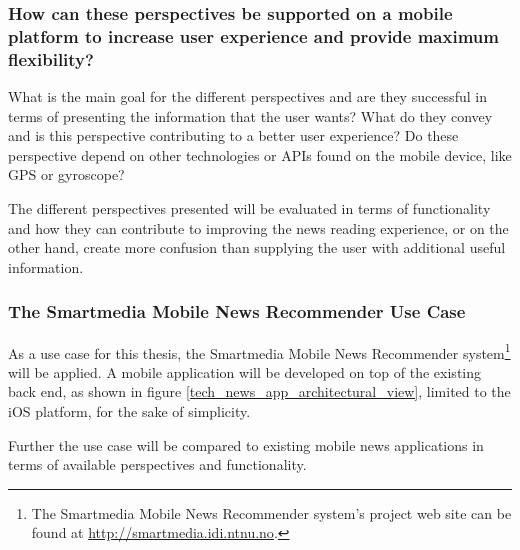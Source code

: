 


\subsubsection{How can these perspectives be supported on a mobile platform to increase user experience and provide maximum flexibility?}

What is the main goal for the different perspectives and are they successful in terms of presenting the information that the user wants? What do they convey and is this perspective contributing to a better user experience? Do these perspective depend on other technologies or APIs found on the mobile device, like GPS or gyroscope?

The different perspectives presented will be evaluated in terms of functionality and how they can contribute to improving the news reading experience, or on the other hand, create more confusion than supplying the user with additional useful information.


\subsubsection{The Smartmedia Mobile News Recommender Use Case}
As a use case for this thesis, the Smartmedia Mobile News Recommender system\footnote{The Smartmedia Mobile News Recommender system's project web site can be found at \url{http://smartmedia.idi.ntnu.no}.} will be applied. A mobile application will be developed on top of the existing back end, as shown in figure \ref{tech_news_app_architectural_view}, limited to the iOS platform, for the sake of simplicity.

Further the use case will be compared to existing mobile news applications in terms of available perspectives and functionality.

